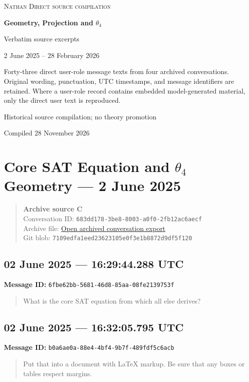 \documentclass[11pt,letterpaper]{article}
\newcommand{\messageentry}[3]{%
  \Needspace{7\baselineskip}
  \subsection*{#1}
  {\small\textbf{Message ID:} \texttt{#2}}
  \vspace{2pt}
}
\newcommand{\sourceblock}[4]{%
  \begin{quote}\small
  \textbf{#1}\\
  Conversation ID: \texttt{#2}\\
  Archive file: \href{#3}{Open archived conversation export}\\
  Git blob: \texttt{#4}
  \end{quote}
}
\begin{document}
\begin{titlepage}
\centering
\vspace*{1.15in}
{\Large\textsc{Nathan Direct source compilation}\par}
\vspace{0.45in}
{\huge\bfseries Geometry, Projection and $\theta_4$\par}
\vspace{0.22in}
{\large Verbatim source excerpts\par}
\vspace{0.7in}
{\large 2 June 2025 -- 28 February 2026\par}
\vfill
\begin{minipage}{0.84\textwidth}
\small
Forty-three direct user-role message texts from four archived conversations. Original wording, punctuation, UTC timestamps, and message identifiers are retained. Where a user-role record contains embedded model-generated material, only the direct user text is reproduced.
\end{minipage}
\vfill
{\small Historical source compilation; no theory promotion\par}
{\small Compiled 28 November 2026\par}
\end{titlepage}

\section*{Core SAT Equation and $\theta_4$ Geometry --- 2 June 2025}
\sourceblock{Archive source C}{683dd178-3be8-8003-a0f0-2fb12ac6aecf}{https://github.com/Satobloc/HsH/blob/main/DEVELOPMENT_FULL_CONVOS/CONVO_HAUL_2NOV2026/25.06.02\%E2\%80\%A225.06.02\%E2\%80\%A2\%5B\%2B\%5D\%20Core\%20SAT\%20Equation\%20-\%20raw.json}{7109edfa\hspace{0pt}1eed2362\hspace{0pt}3105e0f3\hspace{0pt}e1b8872d\hspace{0pt}9df5f120}

\messageentry{02 June 2025 --- 16:29:44.288 UTC}{6fbe62bb-5681-46d8-85aa-08fe2139753f}{}
\begin{quote}\small
What is the core SAT equation from which all else derives?
\end{quote}

\messageentry{02 June 2025 --- 16:32:05.795 UTC}{b0a6ae0a-88e4-4bf4-9b7f-489fdf5c6acb}{}
\begin{quote}\small
Put that into a document with LaTeX markup. Be sure that any boxes or tables respect margins.
\end{quote}
\end{document}
